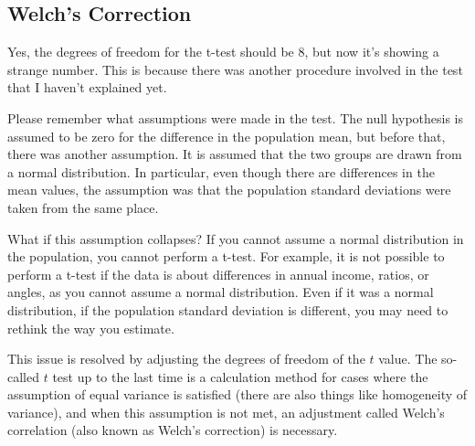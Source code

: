 \documentclass{ltjsbook}
\begin{document}
\subsection{Welch's Correction}
Yes, the degrees of freedom for the t-test should be $8$, but now it's showing a strange number. This is because there was another procedure involved in the test that I haven't explained yet.

Please remember what assumptions were made in the test. The null hypothesis is assumed to be zero for the difference in the population mean, but before that, there was another assumption. It is assumed that the two groups are drawn from a normal distribution. In particular, even though there are differences in the mean values, the assumption was that the population standard deviations were taken from the same place.

What if this assumption collapses? If you cannot assume a normal distribution in the population, you cannot perform a t-test. For example, it is not possible to perform a t-test if the data is about differences in annual income, ratios, or angles, as you cannot assume a normal distribution. Even if it was a normal distribution, if the population standard deviation is different, you may need to rethink the way you estimate.

This issue is resolved by adjusting the degrees of freedom of the $t$ value. The so-called $t$ test up to the last time is a calculation method for cases where the assumption of equal variance is satisfied (there are also things like homogeneity of variance), and when this assumption is not met, an adjustment called Welch's correlation (also known as Welch's correction) is necessary.
\end{document}
